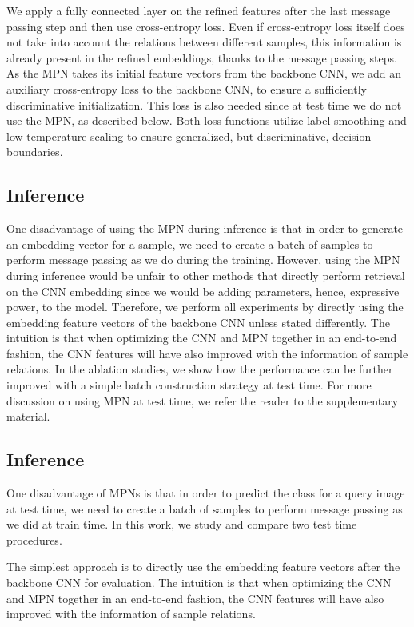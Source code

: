 \documentclass{article}
\begin{document}
\label{subsec:optimization}
We apply a fully connected layer on the refined features after the last message passing step and then use cross-entropy loss.
Even if cross-entropy loss itself does not take into account the relations between different samples, this information is already present in the refined embeddings, thanks to the message passing steps. 
As the MPN takes its initial feature vectors from the backbone CNN, we add an auxiliary cross-entropy loss to the backbone CNN, to ensure a sufficiently discriminative initialization. This loss is also needed since at test time we do not use the MPN, as described below. 
Both loss functions utilize label smoothing and low temperature scaling \cite{DBLP:journals/corr/abs-2004-01113,DBLP:journals/corr/abs-1811-12649} to ensure generalized, but discriminative, decision boundaries.
\vspace{-0.3cm}
\subsection{Inference}
One disadvantage of using the MPN during inference is that in order to generate an embedding vector for a sample, we need to create a batch of samples to perform message passing as we do during the training. 
However, using the MPN during inference would be unfair to other methods that directly perform retrieval on the CNN embedding since we would be adding parameters, hence, expressive power, to the model. Therefore, we perform all experiments by directly using the embedding feature vectors of the backbone CNN unless stated differently. The intuition is that when optimizing the CNN and MPN together in an end-to-end fashion, the CNN features will have also improved with the information of sample relations.
In the ablation studies, we show how the performance can be further improved with a simple batch construction strategy at test time. For more discussion on using MPN at test time, we refer the reader to the supplementary material.


\iffalse
\subsection{Inference}
One disadvantage of MPNs is that in order to predict the class for a query image at test time, we need to create a batch of samples to perform message passing as we did at train time. In this work, we study and compare two test time procedures.

 The simplest approach is to directly use the embedding feature vectors after the backbone CNN for evaluation. The intuition is that when optimizing the CNN and MPN together in an end-to-end fashion, the CNN features will have also improved with the information of sample relations.
\end{document}
